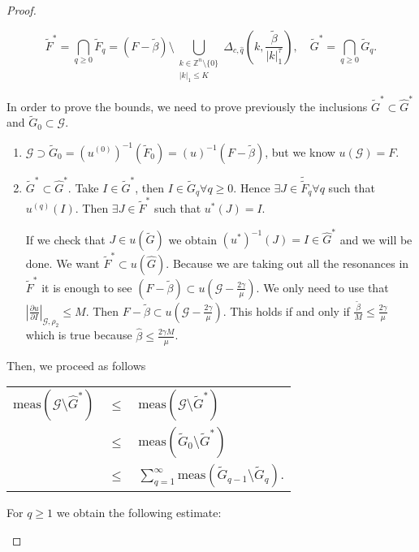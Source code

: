 \begin{proof}
\begin{enumerate}
$$\tilde F^* = \bigcap_{q\geq 0} \tilde F_q = (F - \tilde\beta) \setminus \bigcup_{\substack{k\in\mathbb{Z}^n\setminus\{0\} \\ |k|_1 \leq K}} \Delta_{c,\hat q}(k,\frac{\tilde \beta}{|k|_1^\tau}), \quad \tilde G^* = \bigcap_{q\geq 0} \tilde G_q.$$

In order to prove the bounds, we need to prove previously the inclusions $\tilde G^* \subset \hat G^*$ and $\tilde G_0 \subset \mathcal{G}$.

\begin{enumerate}
\item $\mathcal{G} \supset \tilde G_0 = (u^{(0)})^{-1}(\tilde F_0) = (u)^{-1}(F-\tilde\beta)$, but we know $u(\mathcal{G}) = F$.

\item $\tilde G^* \subset \hat G^*$. Take $I\in \tilde G^*$, then $I\in \tilde G_q \forall q\geq 0$. Hence $\exists J \in \tilde \tilde F_q \forall q$ such that $u^{(q)}(I)$. Then $\exists J \in \tilde F^*$ such that $u^*(J) = I$.

If we check that $J \in u(\tilde G)$ we obtain $(u^*)^{-1}(J) = I \in \hat G^*$ and we will be done.
We want $\tilde F^* \subset u(\hat G)$. Because we are taking out all the resonances in $\tilde F^*$ it is enough to see $(F - \tilde \beta) \subset u(\mathcal{G} - \frac{2\gamma}{\mu})$. We only need to use that $|\frac{\partial u}{\partial I}|_{\mathcal{G},\rho_2} \leq M$. Then $F - \tilde\beta \subset u(\mathcal{G}-\frac{2\gamma}{\mu})$. This holds if and only if $\frac{\tilde \beta}{M} \leq \frac{2\gamma}{\mu}$ which is true because $\hat \beta \leq \frac{2\gamma M}{\mu}$.

\end{enumerate}

Then, we proceed as follows

\begin{longtable}{rcl}

$\text{meas}(\mathcal{G}\setminus \hat G^*)$ & $\leq$ & $\text{meas}(\mathcal{G}\setminus \tilde G^*)$\\

& $\leq$ & $\text{meas}(\tilde G_0\setminus \tilde G^*)$\\
& $\leq$ & $\sum_{q=1}^{\infty}\text{meas}(\tilde G_{q-1} \setminus  \tilde G_q).$\\

\end{longtable}

For $q \geq 1$ we obtain the following estimate:


\end{enumerate}
\end{proof}
